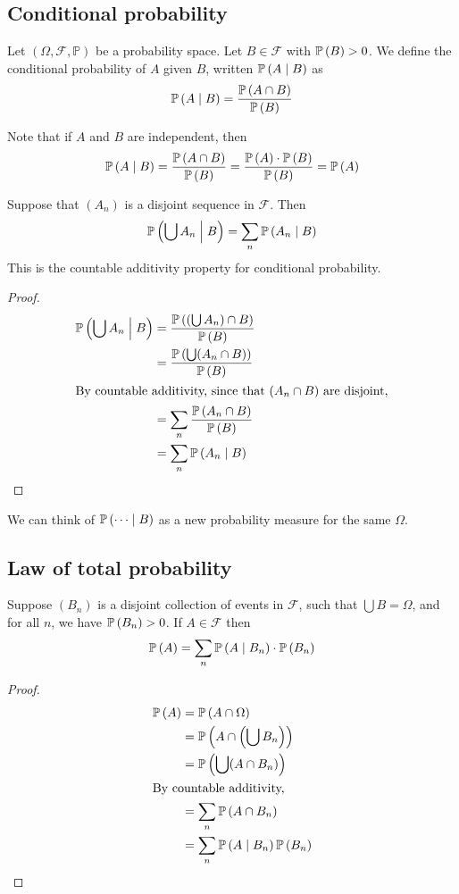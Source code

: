 \subsection{Conditional probability}
\begin{definition}
	Let \((\Omega, \mathcal F, \mathbb P)\) be a probability space.
	Let \(B \in \mathcal F\) with \(\mathbb{P}\left({B}\right) > 0\).
	We define the conditional probability of \(A\) given \(B\), written \(\mathbb{P}\left({A \mid B}\right)\) as
	\[
		\mathbb{P}\left({A \mid B}\right) = \frac{\mathbb{P}\left({A \cap B}\right)}{\mathbb{P}\left({B}\right)}
	\]
\end{definition}
\noindent Note that if \(A\) and \(B\) are independent, then
\[
	\mathbb{P}\left({A \mid B}\right) = \frac{\mathbb{P}\left({A \cap B}\right)}{\mathbb{P}\left({B}\right)} = \frac{\mathbb{P}\left({A}\right) \cdot \mathbb{P}\left({B}\right)}{\mathbb{P}\left({B}\right)} = \mathbb{P}\left({A}\right)
\]
\begin{claim}
	Suppose that \((A_n)\) is a disjoint sequence in \(\mathcal F\).
	Then
	\[
		\mathbb{P}\left({\bigcup A_n \mathrel{\Big|} B}\right) = \sum_{n} \mathbb{P}\left({A_n \mid B}\right)
	\]
	This is the countable additivity property for conditional probability.
\end{claim}
\begin{proof}
	\begin{align*}
		\mathbb{P}\left({\bigcup A_n \mathrel{\Big|} B}\right) & = \frac{\mathbb{P}\left({(\bigcup A_n) \cap B}\right)}{\mathbb{P}\left({B}\right)} \\
		                                     & = \frac{\mathbb{P}\left({\bigcup (A_n \cap B)}\right)}{\mathbb{P}\left({B}\right)} \\
		\intertext{By countable additivity, since that \((A_n \cap B)\) are disjoint,}
		                                     & = \sum_n \frac{\mathbb{P}\left({A_n \cap B}\right)}{\mathbb{P}\left({B}\right)}    \\
		                                     & = \sum_n \mathbb{P}\left({A_n \mid B}\right)
	\end{align*}
\end{proof}
\noindent We can think of \(\mathbb{P}\left({\dots \mid B}\right)\) as a new probability measure for the same \(\Omega\).

\subsection{Law of total probability}
\begin{claim}
	Suppose \((B_n)\) is a disjoint collection of events in \(\mathcal F\), such that \(\bigcup B = \Omega\), and for all \(n\), we have \(\mathbb{P}\left({B_n}\right) > 0\).
	If \(A \in \mathcal F\) then
	\[
		\mathbb{P}\left({A}\right) = \sum_n \mathbb{P}\left({A \mid B_n}\right) \cdot \mathbb{P}\left({B_n}\right)
	\]
\end{claim}
\begin{proof}
	\begin{align*}
		\mathbb{P}\left({A}\right) & = \mathbb{P}\left({A \cap \Omega}\right)                   \\
		         & = \mathbb{P}\left({A \cap \left(\bigcup B_n\right)}\right) \\
		         & = \mathbb{P}\left({\bigcup(A \cap B_n)}\right)             \\
		\intertext{By countable additivity,}
		         & = \sum_n \mathbb{P}\left({A \cap B_n}\right)               \\
		         & = \sum_n \mathbb{P}\left({A \mid B_n}\right) \mathbb{P}\left({B_n}\right)
	\end{align*}
\end{proof}

